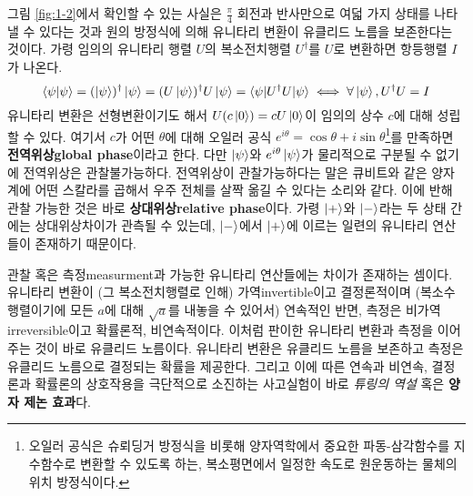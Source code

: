 \documentclass[a4paper,chapter,atbegshi]{oblivoir}
\begin{document}
그림 \ref{fig:1-2}에서 확인할 수 있는 사실은 $\frac{\pi}{4}$
회전과 반사만으로 여덟 가지 상태를 나타낼 수 있다는 것과 원의 방정식에 의해
유니타리 변환이 유클리드 노름을 보존한다는 것이다. 가령 임의의 유니타리 행렬
$U$의 복소전치행렬 $U^{\dagger}$를 $U$로 변환하면 항등행렬 $I$가 나온다.
\[
  \braket{\psi|\psi} = (\ket{\psi})^{\dagger}\ket{\psi} 
              = (U\ket{\psi})^{\dagger}U\ket{\psi}
              =\braket{\psi|U^{\dagger}U|\psi} 
  \iff\forall\ket{\psi},U^{\dagger}U= I
\]
유니타리 변환은 선형변환이기도 해서 $U(c\ket0)=cU\ket0$이 임의의 상수 $c$에 
대해 성립할 수 있다. 여기서 $c$가 어떤 $\theta$에 대해 오일러 공식 
$e^{i\theta}=\cos\theta+i\sin\theta$\footnote{오일러 공식은 슈뢰딩거
방정식을 비롯해 양자역학에서 중요한 파동-삼각함수를 지수함수로 변환할 수 있도록
하는, 복소평면에서 일정한 속도로 원운동하는 물체의 위치 방정식이다.}를 만족하면 
\textbf{전역위상\tiny global phase}이라고 한다. 다만 $\ket{\psi}$와 
$e^{i\theta}\ket{\psi}$가 물리적으로 구분될 수 없기에 전역위상은
관찰불가능하다. 전역위상이 관찰가능하다는 말은 큐비트와 같은
양자계에 어떤 스칼라를 곱해서 우주 전체를 살짝 옮길 수 있다는
소리와 같다. 이에 반해 관찰 가능한 것은 바로 \textbf{상대위상\tiny relative
phase}이다. 가령 $\ket+$와 $\ket-$라는 두 상태 간에는 상대위상차이가 관측될 수
있는데, $\ket-$에서 $\ket+$에 이르는 일련의 유니타리 연산들이 존재하기 때문이다.

관찰 혹은 측정{\tiny measurment}과 가능한 유니타리 연산들에는 차이가 존재하는
셈이다. 유니타리 변환이 (그 복소전치행렬로 인해) 가역{\tiny invertible}이고
결정론적이며 (복소수 행렬이기에 모든 $a$에 대해 $\sqrt{a}$를 내놓을 수 있어서)
연속적인 반면, 측정은 비가역{\tiny irreversible}이고 확률론적, 비연속적이다.
이처럼 판이한 유니타리 변환과 측정을 이어주는 것이 바로 유클리드 노름이다.
유니타리 변환은 유클리드 노름을 보존하고 측정은
유클리드 노름으로 결정되는 확률을 제공한다. 그리고 이에 따른 연속과 비연속,
결정론과 확률론의 상호작용을 극단적으로 소진하는 사고실험이 바로 \emph{튜링의
역설} 혹은 \textbf{양자 제논 효과}다.
\end{document}
